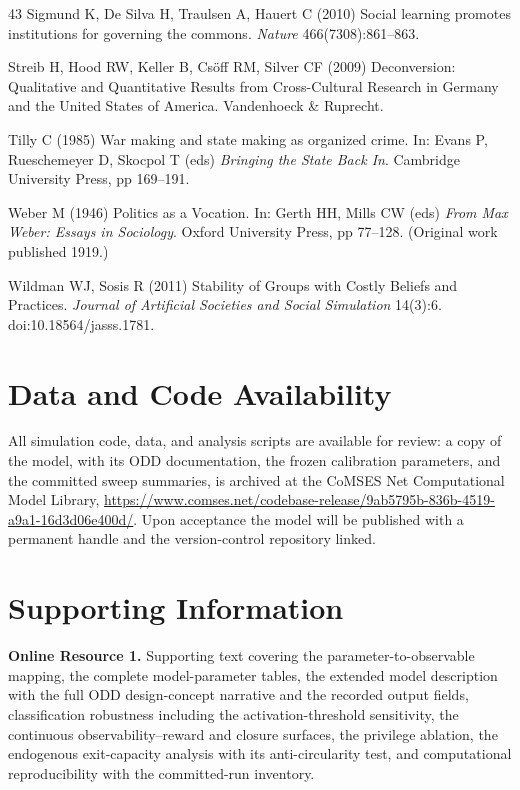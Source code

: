\documentclass[12pt]{article}
\begin{document}
\begin{thebibliography}{43}
Sigmund K, De Silva H, Traulsen A, Hauert C (2010) Social learning promotes institutions for governing the commons. \textit{Nature} 466(7308):861--863.

Streib H, Hood RW, Keller B, Cs\"off RM, Silver CF (2009) Deconversion: Qualitative and Quantitative Results from Cross-Cultural Research in Germany and the United States of America. Vandenhoeck \& Ruprecht.

Tilly C (1985) War making and state making as organized crime. In: Evans P, Rueschemeyer D, Skocpol T (eds) \textit{Bringing the State Back In}. Cambridge University Press, pp 169--191.

Weber M (1946) Politics as a Vocation. In: Gerth HH, Mills CW (eds) \textit{From Max Weber: Essays in Sociology}. Oxford University Press, pp 77--128. (Original work published 1919.)

Wildman WJ, Sosis R (2011) Stability of Groups with Costly Beliefs and Practices. \textit{Journal of Artificial Societies and Social Simulation} 14(3):6. doi:10.18564/jasss.1781.

\end{thebibliography}

\section*{Data and Code Availability}

All simulation code, data, and analysis scripts are available for review: a copy of the model, with its ODD documentation, the frozen calibration parameters, and the committed sweep summaries, is archived at the CoMSES Net Computational Model Library, \url{https://www.comses.net/codebase-release/9ab5795b-836b-4519-a9a1-16d3d06e400d/}. Upon acceptance the model will be published with a permanent handle and the version-control repository linked.

\section*{Supporting Information}

\noindent\textbf{Online Resource 1.} Supporting text covering the parameter-to-observable mapping, the complete model-parameter tables, the extended model description with the full ODD design-concept narrative and the recorded output fields, classification robustness including the activation-threshold sensitivity, the continuous observability--reward and closure surfaces, the privilege ablation, the endogenous exit-capacity analysis with its anti-circularity test, and computational reproducibility with the committed-run inventory.
\end{document}
